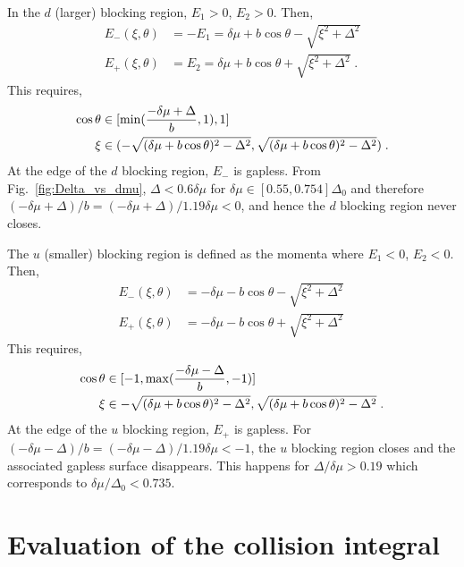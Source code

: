 \documentclass[10pt, aps, prd, superscriptaddress, nofootinbib, 
               amsmath, amssymb, twocolumn,
               preprintnumbers, showpacs,
               raggedbottom,
               floatfix]{revtex4-1}
\begin{document}
In the $d$ (larger) blocking region, $E_1>0$, $E_2>0$. Then,
\begin{equation}
\begin{split}
E_-(\xi, \theta) &= -E_1 = \delta\mu + b\cos\theta 
  - \sqrt{\xi^2+\Delta^2}\\
E_+(\xi, \theta) &= E_2 =\delta\mu + b\cos\theta + \sqrt{\xi^2+\Delta^2}\;.
~\label{eq:excitations_dblocking}
\end{split}
\end{equation}
This requires,
\begin{equation}
\begin{split}
\cos\theta &\in [{\rm{min}}(\frac{-\delta\mu+\Delta}{b},1), 1] \\
\xi &\in(-\sqrt{(\delta\mu+b\cos\theta)^2-\Delta^2},
\sqrt{(\delta\mu+b\cos\theta)^2-\Delta^2})\;.
\end{split}
\end{equation}
At the edge of the $d$ blocking region, $E_-$ is gapless. From
Fig.~\ref{fig:Delta_vs_dmu}, $\Delta<0.6\delta\mu$ for
$\delta\mu\in[0.55,0.754]\Delta_{0}$ and therefore
$(-\delta\mu+\Delta)/b=(-\delta\mu+\Delta)/1.19\delta\mu<0$,
and hence the $d$ blocking region never closes.

The $u$ (smaller) blocking region is defined as the momenta where $E_1<0$, $E_2<0$. Then,
\begin{equation}
\begin{split}
E_-(\xi, \theta) &= -\delta\mu - b\cos\theta 
   - \sqrt{\xi^2+\Delta^2}\\
E_+(\xi, \theta) &= -\delta\mu - b\cos\theta + \sqrt{\xi^2+\Delta^2}
~\label{eq:excitations_ublocking}
\end{split}
\end{equation}
This requires,
\begin{equation}
\begin{split}
\cos\theta &\in [-1, {\rm{max}}(\frac{-\delta\mu-\Delta}{b},-1)] \\
\xi &\in
{-\sqrt{(\delta\mu+b\cos\theta)^2-\Delta^2},\sqrt{(\delta\mu+b\cos\theta)^2-\Delta^2}}\;.
\end{split}
\end{equation}
At the edge of the $u$ blocking region, $E_+$ is gapless. For 
$(-\delta\mu-\Delta)/b=(-\delta\mu-\Delta)/1.19\delta\mu<-1$,
the $u$ blocking region closes and the associated gapless surface disappears.
This happens for $\Delta/\delta\mu>0.19$ which corresponds to
$\delta\mu/\Delta_{0}<0.735$.

\section{Evaluation of the collision integral}
\label{sec:numerics}
\end{document}
